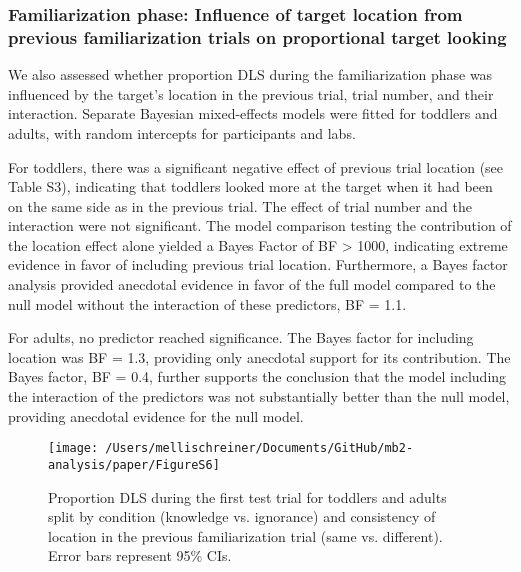 \documentclass[
  man, donotrepeattitle,floatsintext]{apa6}
\begin{document}
\subsubsection{Familiarization phase: Influence of target location from previous familiarization trials on proportional target looking}\label{familiarization-phase-influence-of-target-location-from-previous-familiarization-trials-on-proportional-target-looking}

We also assessed whether proportion DLS during the familiarization phase was influenced by the target's location in the previous trial, trial number, and their interaction. Separate Bayesian mixed-effects models were fitted for toddlers and adults, with random intercepts for participants and labs.

For toddlers, there was a significant negative effect of previous trial location (see Table S3), indicating that toddlers looked more at the target when it had been on the same side as in the previous trial. The effect of trial number and the interaction were not significant. The model comparison testing the contribution of the location effect alone yielded a Bayes Factor of BF \textgreater{} 1000, indicating extreme evidence in favor of including previous trial location. Furthermore, a Bayes factor analysis provided anecdotal evidence in favor of the full model compared to the null model without the interaction of these predictors, BF = 1.1.

For adults, no predictor reached significance. The Bayes factor for including location was BF = 1.3, providing only anecdotal support for its contribution. The Bayes factor, BF = 0.4, further supports the conclusion that the model including the interaction of the predictors was not substantially better than the null model, providing anecdotal evidence for the null model.

\begin{figure}

{\centering \texttt{[image: /Users/mellischreiner/Documents/GitHub/mb2-analysis/paper/FigureS6]} 

}

\caption{Proportion DLS during the first test trial for toddlers and adults split by condition (knowledge vs. ignorance) and consistency of location in the previous familiarization trial (same vs. different). Error bars represent 95\% CIs.}\label{fig:fig11}
\end{figure}
\end{document}
